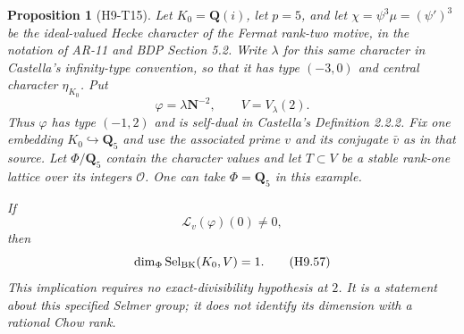 \documentclass[11pt,a4paper]{article}
\newtheorem{proposition}[theorem]{Proposition}
\begin{document}
\begin{proposition}[H9-T15]
Let $K_0=\mathbf Q(i)$, let $p=5$, and let
$\chi=\psi^3\mu=(\psi')^3$ be the ideal-valued Hecke character of
the Fermat rank-two motive, in the notation of AR-11 and BDP
Section 5.2. Write $\lambda$ for this same character in Castella's
infinity-type convention, so that it has type $(-3,0)$ and central
character $\eta_{K_0}$. Put
\[
 \varphi=\lambda\mathbf N^{-2},\qquad
 V=V_\lambda(2).
\]
Thus $\varphi$ has type $(-1,2)$ and is self-dual in Castella's
Definition 2.2.2. Fix one embedding $K_0\hookrightarrow\mathbf Q_5$
and use the associated prime $v$ and its conjugate $\bar v$ as in
that source. Let $\Phi/\mathbf Q_5$ contain the character values
and let $T\subset V$ be a stable rank-one lattice over its integers
$\mathcal O$. One can take $\Phi=\mathbf Q_5$ in this example.

If
\[
                  \mathcal L_v(\varphi)(0)\ne0,              \tag{H9.56}
\]
then
\[
 \dim_\Phi\operatorname{Sel}_{\rm BK}(K_0,V)=1.             \tag{H9.57}
\]
This implication requires no exact-divisibility hypothesis at $2$.
It is a statement about this specified Selmer group; it does not
identify its dimension with a rational Chow rank.
\end{proposition}
\end{document}
